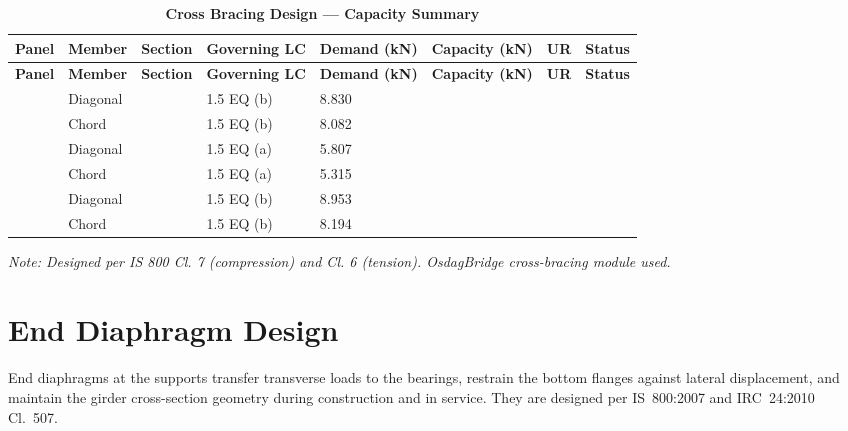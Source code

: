 \documentclass[12pt,a4paper]{report}
\numberwithin{table}{chapter}
\numberwithin{figure}{chapter}
\begin{document}
\vspace{1em}
\begin{longtable}{|C{2.0cm}|L{1.8cm}|C{2.2cm}|C{3.0cm}|C{1.8cm}|C{1.8cm}|C{1.2cm}|C{1.8cm}|}
\caption{\textbf{Cross Bracing Design --- Capacity Summary}}
\hline
{} \textbf{Panel} & \textbf{Member} & \textbf{Section} & \textbf{Governing LC} & \textbf{Demand (kN)} & \textbf{Capacity (kN)} & \textbf{UR} & \textbf{Status} \\[6pt]
\hline
\endfirsthead
\hline
{} \textbf{Panel} & \textbf{Member} & \textbf{Section} & \textbf{Governing LC} & \textbf{Demand (kN)} & \textbf{Capacity (kN)} & \textbf{UR} & \textbf{Status} \\[6pt]
\hline
\endhead
{} & Diagonal &  & 1.5 EQ (b) & 8.830 &  &  &  \\[6pt]
 & Chord &  & 1.5 EQ (b) & 8.082 &  &  &  \\[6pt]
\hline
{} & Diagonal &  & 1.5 EQ (a) & 5.807 &  &  &  \\[6pt]
 & Chord &  & 1.5 EQ (a) & 5.315 &  &  &  \\[6pt]
\hline
{} & Diagonal &  & 1.5 EQ (b) & 8.953 &  &  &  \\[6pt]
 & Chord &  & 1.5 EQ (b) & 8.194 &  &  &  \\[6pt]
\hline
\end{longtable}
\noindent\textit{Note: Designed per IS 800 Cl. 7 (compression) and Cl. 6 (tension). OsdagBridge cross-bracing module used.}

\section{End Diaphragm Design}
\label{sec:end-diaphragm}

End diaphragms at the supports transfer transverse loads to the bearings, restrain the bottom flanges against lateral displacement, and maintain the girder cross-section geometry during construction and in service. They are designed per IS~800:2007 and IRC~24:2010 Cl.~507.

\vspace{1em}

\vspace{0.4em}
\noindent
\setlength{\tabcolsep}{4pt}
\setlength{\LTleft}{0pt}
\setlength{\LTright}{\fill}
\end{document}
